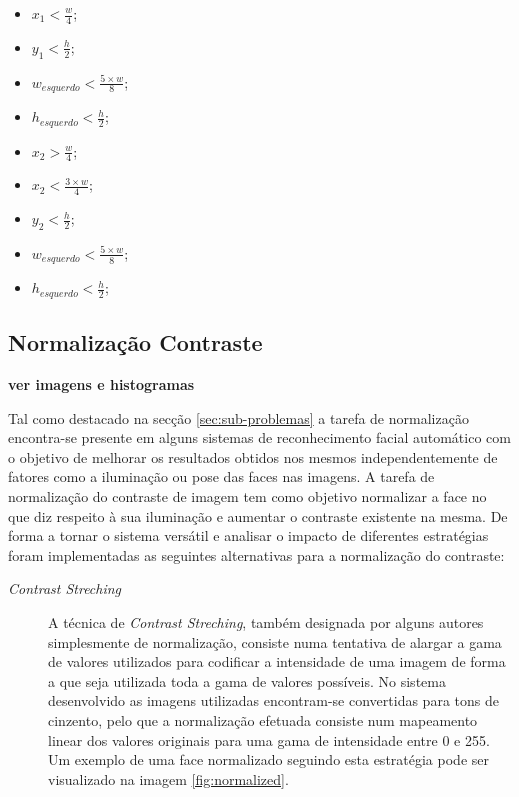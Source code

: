 \begin{itemize}
\item $x_1 < \frac{w}{4}$;
\item $y_1 < \frac{h}{2}$;
\item $w_{esquerdo} < \frac{5\times w}{8}$;
\item $h_{esquerdo} < \frac{h}{2}$;

\item $x_2 > \frac{w}{4}$;
\item $x_2 < \frac{3\times w}{4}$;
\item $y_2 < \frac{h}{2}$;
\item $w_{esquerdo} < \frac{5\times w}{8}$;
\item $h_{esquerdo} < \frac{h}{2}$;
\end{itemize}

\subsection{Normalização Contraste} \label{sec:normalizacao}
\textbf{ver imagens e histogramas}

Tal como destacado na secção \ref{sec:sub-problemas} a tarefa de normalização encontra-se presente em alguns sistemas de reconhecimento facial automático com o objetivo de melhorar os resultados obtidos nos mesmos independentemente de fatores como a iluminação ou pose das faces nas imagens. A tarefa de normalização do contraste de imagem tem como objetivo normalizar a face no que diz respeito à sua iluminação e aumentar o contraste existente na mesma. De forma a tornar o sistema versátil e analisar o impacto de diferentes estratégias foram implementadas as seguintes alternativas para a normalização do contraste:

\begin{description}
\item[\textit{Contrast Streching}]
A técnica de \textit{Contrast Streching}, também designada por alguns autores simplesmente de normalização, consiste numa tentativa de alargar a gama de valores utilizados para codificar a intensidade de uma imagem de forma a que seja utilizada toda a gama de valores possíveis. No sistema desenvolvido as imagens utilizadas encontram-se convertidas para tons de cinzento, pelo que a normalização efetuada consiste num mapeamento linear dos valores originais para uma gama de intensidade entre 0 e 255. Um exemplo de uma face normalizado seguindo esta estratégia pode ser visualizado na imagem \ref{fig:normalized}.
\end{description}

